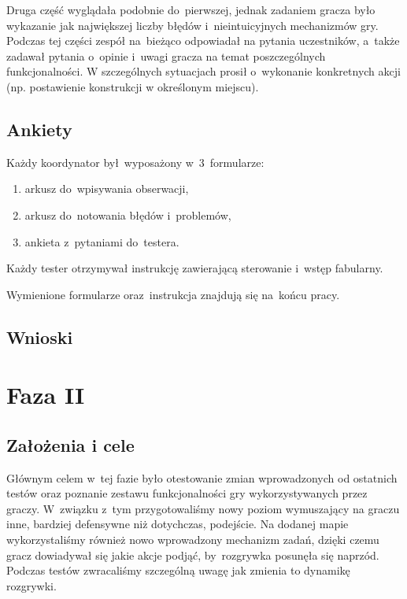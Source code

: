 \documentclass[licencjacka]{pracamgr}
\begin{document}
      Druga część wyglądała podobnie do~pierwszej, jednak zadaniem gracza było wykazanie
      jak największej liczby błędów i~nieintuicyjnych mechanizmów gry.
      Podczas tej części zespół na~bieżąco odpowiadał na pytania uczestników,
      a~także zadawał pytania o~opinie i~uwagi gracza na temat poszczególnych funkcjonalności.
      W szczególnych sytuacjach prosił o~wykonanie konkretnych akcji (np. postawienie konstrukcji w określonym miejscu).

      \subsection{Ankiety}
      Każdy koordynator był~wyposażony w~3~formularze:
      \begin{enumerate}
	\item arkusz do~wpisywania obserwacji,
	\item arkusz do~notowania błędów i~problemów,
	\item ankieta z~pytaniami do~testera.
      \end{enumerate}
      Każdy tester otrzymywał instrukcję zawierającą sterowanie i~wstęp fabularny.

      \noindent
      Wymienione formularze oraz~instrukcja znajdują się na~końcu pracy.

      \subsection{Wnioski}

    \section{Faza II}

      \subsection{Założenia i cele}
      Głównym celem w~tej fazie było otestowanie zmian wprowadzonych od ostatnich testów oraz poznanie zestawu funkcjonalności gry
      wykorzystywanych przez graczy. W~związku z~tym przygotowaliśmy nowy poziom wymuszający na graczu inne, bardziej defensywne
      niż dotychczas, podejście. Na dodanej mapie wykorzystaliśmy również nowo wprowadzony mechanizm zadań, dzięki czemu gracz
      dowiadywał się jakie akcje podjąć, by~rozgrywka posunęła się naprzód. Podczas testów zwracaliśmy szczególną uwagę jak zmienia
      to dynamikę rozgrywki.
\end{document}
